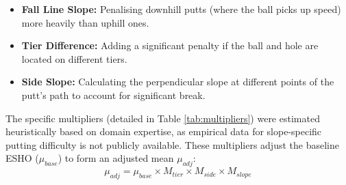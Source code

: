 \documentclass[11pt, letterpaper]{article}
\begin{document}
\begin{enumerate}
\begin{itemize}
    \item \textbf{Fall Line Slope:} Penalising downhill putts (where the ball picks up speed) more heavily than uphill ones.
    \item \textbf{Tier Difference:} Adding a significant penalty if the ball and hole are located on different tiers.
    \item \textbf{Side Slope:} Calculating the perpendicular slope at different points of the putt's path to account for significant break.
\end{itemize}

The specific multipliers (detailed in Table \ref{tab:multipliers}) were estimated heuristically based on domain expertise, as empirical data for slope-specific putting difficulty is not publicly available. These multipliers adjust the baseline ESHO ($\mu_{base}$) to form an adjusted mean $\mu_{adj}$:
\[ \mu_{adj} = \mu_{base} \times M_{tier} \times M_{side} \times M_{slope} \]


\end{enumerate}
\end{document}
